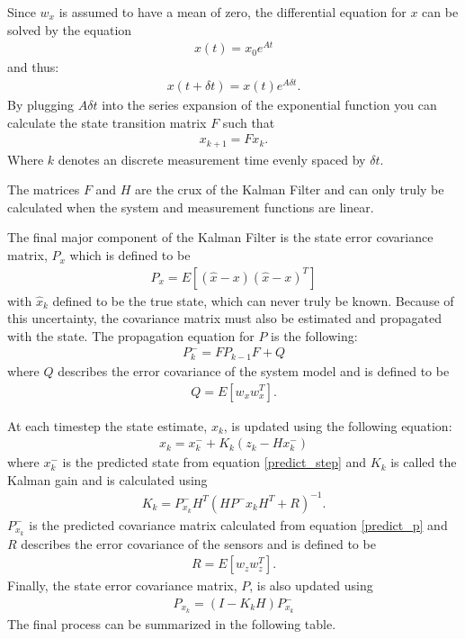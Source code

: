 Since $w_x$ is assumed to have a mean of zero, the differential equation for $x$ can be solved by the equation
\begin{align}
x(t) = x_0e^{At}
\end{align}
and thus:
\begin{align}
x(t + \delta t) = x(t)e^{A\delta t}.
\end{align}
By plugging $A\delta t$ into the series expansion of the exponential function you can calculate the state transition matrix $F$ such that
\begin{align}\label{predict_step}
x_{k+1} = Fx_{k}.
\end{align}
Where $k$ denotes an discrete measurement time evenly spaced by $\delta t$.

The matrices $F$ and $H$ are the crux of the Kalman Filter and can only truly be calculated when the system and measurement functions are linear. 

The final major component of the Kalman Filter is the state error covariance matrix, $P_x$ which is defined to be \cite{kf_derivation}
\begin{align}
P_x = E[(\hat{x} - x)(\hat{x} - x)^T]
\end{align} 
with $\hat{x}_k$ defined to be the true state, which can never truly be known. Because of this uncertainty, the covariance matrix must also be estimated and propagated with the state. The propagation equation for $P$ is the following:
\begin{align}\label{predict_p}
P^-_{k} = FP_{k-1}F + Q
\end{align} 
where $Q$ describes the error covariance of the system model and is defined to be
\begin{align}
Q = E[w_xw_x^T].
\end{align} 

At each timestep the state estimate, $x_k$, is updated using the following equation:
\begin{align}
x_{k} = x^-_{k} + K_k(z_k - Hx^-_k)
\end{align} 
where $x^-_k$ is the predicted state from equation \eqref{predict_step} and $K_k$ is called the Kalman gain and is calculated using
\begin{align}
K_k = P^-_{x_k}H^T(HP^-{x_k}H^T + R)^{-1}.
\end{align} 
$P^-_{x_k}$ is the predicted covariance matrix calculated from equation \eqref{predict_p} and $R$ describes the error covariance of the sensors and is defined to be
\begin{align}
R = E[w_zw_z^T].
\end{align} 
Finally, the state error covariance matrix, $P$, is also updated using
\begin{align}
P_{x_k} = (I - K_kH)P^-_{x_k}
\end{align} 
The final process can be summarized in the following table.

